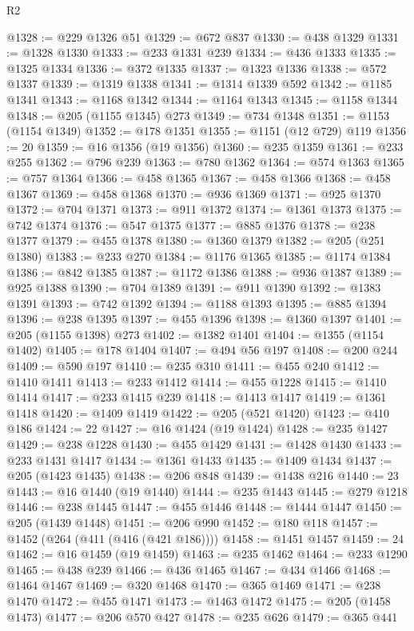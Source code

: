 \begin{lexlean}{R2}
\begin{coremodule}
@1328 := @229 @1326 @51
@1329 := @672 @837
@1330 := @438 @1329
@1331 := @1328 @1330
@1333 := @233 @1331 @239
@1334 := @436 @1333
@1335 := @1325 @1334
@1336 := @372 @1335
@1337 := @1323 @1336
@1338 := @572 @1337
@1339 := @1319 @1338
@1341 := @1314 @1339 @592
@1342 := @1185 @1341
@1343 := @1168 @1342
@1344 := @1164 @1343
@1345 := @1158 @1344
@1348 := @205 (@1155 @1345) @273
@1349 := @734 @1348
@1351 := @1153 (@1154 @1349)
@1352 := @178 @1351
@1355 := @1151 (@12 @729) @119
@1356 := 20
@1359 := @16 @1356 (@19 @1356)
@1360 := @235 @1359
@1361 := @233 @255
@1362 := @796 @239
@1363 := @780 @1362
@1364 := @574 @1363
@1365 := @757 @1364
@1366 := @458 @1365
@1367 := @458 @1366
@1368 := @458 @1367
@1369 := @458 @1368
@1370 := @936 @1369
@1371 := @925 @1370
@1372 := @704 @1371
@1373 := @911 @1372
@1374 := @1361 @1373
@1375 := @742 @1374
@1376 := @547 @1375
@1377 := @885 @1376
@1378 := @238 @1377
@1379 := @455 @1378
@1380 := @1360 @1379
@1382 := @205 (@251 @1380)
@1383 := @233 @270
@1384 := @1176 @1365
@1385 := @1174 @1384
@1386 := @842 @1385
@1387 := @1172 @1386
@1388 := @936 @1387
@1389 := @925 @1388
@1390 := @704 @1389
@1391 := @911 @1390
@1392 := @1383 @1391
@1393 := @742 @1392
@1394 := @1188 @1393
@1395 := @885 @1394
@1396 := @238 @1395
@1397 := @455 @1396
@1398 := @1360 @1397
@1401 := @205 (@1155 @1398) @273
@1402 := @1382 @1401
@1404 := @1355 (@1154 @1402)
@1405 := @178 @1404
@1407 := @494 @56 @197
@1408 := @200 @244
@1409 := @590 @197
@1410 := @235 @310
@1411 := @455 @240
@1412 := @1410 @1411
@1413 := @233 @1412
@1414 := @455 @1228
@1415 := @1410 @1414
@1417 := @233 @1415 @239
@1418 := @1413 @1417
@1419 := @1361 @1418
@1420 := @1409 @1419
@1422 := @205 (@521 @1420)
@1423 := @410 @186
@1424 := 22
@1427 := @16 @1424 (@19 @1424)
@1428 := @235 @1427
@1429 := @238 @1228
@1430 := @455 @1429
@1431 := @1428 @1430
@1433 := @233 @1431 @1417
@1434 := @1361 @1433
@1435 := @1409 @1434
@1437 := @205 (@1423 @1435)
@1438 := @206 @848
@1439 := @1438 @216
@1440 := 23
@1443 := @16 @1440 (@19 @1440)
@1444 := @235 @1443
@1445 := @279 @1218
@1446 := @238 @1445
@1447 := @455 @1446
@1448 := @1444 @1447
@1450 := @205 (@1439 @1448)
@1451 := @206 @990
@1452 := @180 @118
@1457 := @1452 (@264 (@411 (@416 (@421 @186))))
@1458 := @1451 @1457
@1459 := 24
@1462 := @16 @1459 (@19 @1459)
@1463 := @235 @1462
@1464 := @233 @1290
@1465 := @438 @239
@1466 := @436 @1465
@1467 := @434 @1466
@1468 := @1464 @1467
@1469 := @320 @1468
@1470 := @365 @1469
@1471 := @238 @1470
@1472 := @455 @1471
@1473 := @1463 @1472
@1475 := @205 (@1458 @1473)
@1477 := @206 @570 @427
@1478 := @235 @626
@1479 := @365 @441

\end{coremodule}
\end{lexlean}
